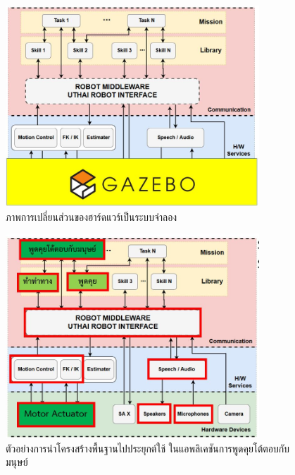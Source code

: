 \clearpage
\begin{figure}[!ht]
	\centering
	\includegraphics[width=0.85\textwidth]{chapter3/images/platform3.JPG}
	\caption{ภาพการเปลี่ยนส่วนของฮาร์ดแวร์เป็นระบบจำลอง}
\end{figure}
\begin{figure}[!ht]
	\centering
	\includegraphics[width=0.85\textwidth]{chapter3/images/platform2.JPG}
	\caption{ตัวอย่างการนำโครงสร้างพื้นฐานไปประยุกต์ใช้ ในแอพลิเคชันการพูดคุยโต้ตอบกับมนุษย์}
\end{figure}

\clearpage
